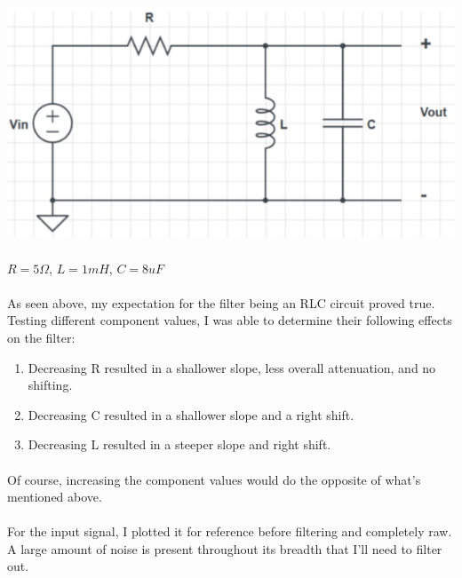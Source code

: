 \documentclass[12pt]{report}
\begin{document}
    \includegraphics[]{RLC.PNG}
    
    \paragraph{} $R = 5\Omega$, $L = 1mH$, $C = 8uF$
    
    \paragraph{} As seen above, my expectation for the filter being an RLC circuit proved true. Testing different component values, I was able to determine their following effects on the filter:
    
    \begin{enumerate}
        \item Decreasing R resulted in a shallower slope, less overall attenuation, and no shifting.
        \item Decreasing C resulted in a shallower slope and a right shift.
        \item Decreasing L resulted in a steeper slope and right shift.
    \end{enumerate}
    
    \paragraph{} Of course, increasing the component values would do the opposite of what's mentioned above. 
    
    \paragraph{} For the input signal, I plotted it for reference before filtering and completely raw. A large amount of noise is present throughout its breadth that I'll need to filter out. 
    
\end{document}
